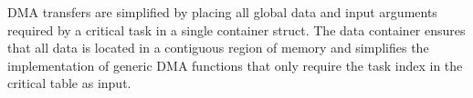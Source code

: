 DMA transfers are simplified by placing all global data and input arguments required by a critical task in a single container struct. 
The data container ensures that all data is located in a contiguous region of memory and simplifies the implementation of generic DMA functions that only require the task index in the critical table as input.


% 
% 
% 
% 	
% 
% 	
% 
% 	
% 
% 
% 
% 	
% 	
% 	

